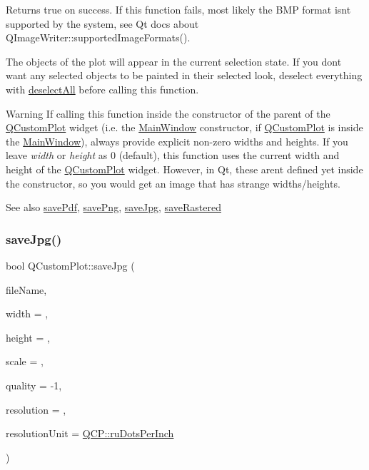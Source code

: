 Returns true on success. If this function fails, most likely the B\+MP format isn\textquotesingle{}t supported by the system, see Qt docs about Q\+Image\+Writer\+::supported\+Image\+Formats().

The objects of the plot will appear in the current selection state. If you don\textquotesingle{}t want any selected objects to be painted in their selected look, deselect everything with \hyperlink{class_q_custom_plot_a9d4808ab925b003054085246c92a257c}{deselect\+All} before calling this function.

\begin{DoxyWarning}{Warning}
If calling this function inside the constructor of the parent of the \hyperlink{class_q_custom_plot}{Q\+Custom\+Plot} widget (i.\+e. the \hyperlink{class_main_window}{Main\+Window} constructor, if \hyperlink{class_q_custom_plot}{Q\+Custom\+Plot} is inside the \hyperlink{class_main_window}{Main\+Window}), always provide explicit non-\/zero widths and heights. If you leave {\itshape width} or {\itshape height} as 0 (default), this function uses the current width and height of the \hyperlink{class_q_custom_plot}{Q\+Custom\+Plot} widget. However, in Qt, these aren\textquotesingle{}t defined yet inside the constructor, so you would get an image that has strange widths/heights.
\end{DoxyWarning}
\begin{DoxySeeAlso}{See also}
\hyperlink{class_q_custom_plot_ad5acd34f6b39c3516887d7e54fec2412}{save\+Pdf}, \hyperlink{class_q_custom_plot_ac92cc9256d12f354b40a4be4600b5fb9}{save\+Png}, \hyperlink{class_q_custom_plot_a76f0d278e630a711fa6f48048cfd83e4}{save\+Jpg}, \hyperlink{class_q_custom_plot_ad7723ce2edfa270632ef42b03a444352}{save\+Rastered} 
\end{DoxySeeAlso}
\mbox{\label{class_q_custom_plot_a76f0d278e630a711fa6f48048cfd83e4}} 
\subsubsection{\texorpdfstring{save\+Jpg()}{saveJpg()}}
{\footnotesize\ttfamily bool Q\+Custom\+Plot\+::save\+Jpg (\begin{DoxyParamCaption}\item[{const Q\+String \&}]{file\+Name,  }\item[{int}]{width = {},  }\item[{int}]{height = {},  }\item[{double}]{scale = {},  }\item[{int}]{quality = {\ttfamily -\/1},  }\item[{int}]{resolution = {},  }\item[{\hyperlink{namespace_q_c_p_a715d46153da230990aa887d0f0602452}{Q\+C\+P\+::\+Resolution\+Unit}}]{resolution\+Unit = {\ttfamily \hyperlink{namespace_q_c_p_a715d46153da230990aa887d0f0602452affb887d8efe79c39a1aca2acd7002afc}{Q\+C\+P\+::ru\+Dots\+Per\+Inch}} }\end{DoxyParamCaption})}

